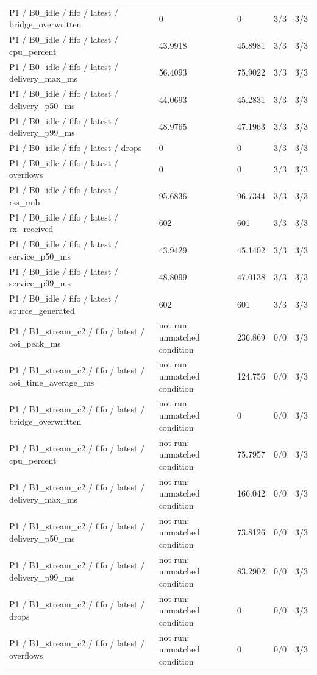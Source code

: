 \begin{tabular}{@{}lllll@{}}
P1 / B0\_idle / fifo / latest / bridge\_overwritten & 0 & 0 & 3/3 & 3/3 \\
P1 / B0\_idle / fifo / latest / cpu\_percent & 43.9918 & 45.8981 & 3/3 & 3/3 \\
P1 / B0\_idle / fifo / latest / delivery\_max\_ms & 56.4093 & 75.9022 & 3/3 & 3/3 \\
P1 / B0\_idle / fifo / latest / delivery\_p50\_ms & 44.0693 & 45.2831 & 3/3 & 3/3 \\
P1 / B0\_idle / fifo / latest / delivery\_p99\_ms & 48.9765 & 47.1963 & 3/3 & 3/3 \\
P1 / B0\_idle / fifo / latest / drops & 0 & 0 & 3/3 & 3/3 \\
P1 / B0\_idle / fifo / latest / overflows & 0 & 0 & 3/3 & 3/3 \\
P1 / B0\_idle / fifo / latest / rss\_mib & 95.6836 & 96.7344 & 3/3 & 3/3 \\
P1 / B0\_idle / fifo / latest / rx\_received & 602 & 601 & 3/3 & 3/3 \\
P1 / B0\_idle / fifo / latest / service\_p50\_ms & 43.9429 & 45.1402 & 3/3 & 3/3 \\
P1 / B0\_idle / fifo / latest / service\_p99\_ms & 48.8099 & 47.0138 & 3/3 & 3/3 \\
P1 / B0\_idle / fifo / latest / source\_generated & 602 & 601 & 3/3 & 3/3 \\
P1 / B1\_stream\_c2 / fifo / latest / aoi\_peak\_ms & not run: unmatched condition & 236.869 & 0/0 & 3/3 \\
P1 / B1\_stream\_c2 / fifo / latest / aoi\_time\_average\_ms & not run: unmatched condition & 124.756 & 0/0 & 3/3 \\
P1 / B1\_stream\_c2 / fifo / latest / bridge\_overwritten & not run: unmatched condition & 0 & 0/0 & 3/3 \\
P1 / B1\_stream\_c2 / fifo / latest / cpu\_percent & not run: unmatched condition & 75.7957 & 0/0 & 3/3 \\
P1 / B1\_stream\_c2 / fifo / latest / delivery\_max\_ms & not run: unmatched condition & 166.042 & 0/0 & 3/3 \\
P1 / B1\_stream\_c2 / fifo / latest / delivery\_p50\_ms & not run: unmatched condition & 73.8126 & 0/0 & 3/3 \\
P1 / B1\_stream\_c2 / fifo / latest / delivery\_p99\_ms & not run: unmatched condition & 83.2902 & 0/0 & 3/3 \\
P1 / B1\_stream\_c2 / fifo / latest / drops & not run: unmatched condition & 0 & 0/0 & 3/3 \\
P1 / B1\_stream\_c2 / fifo / latest / overflows & not run: unmatched condition & 0 & 0/0 & 3/3 \\

\end{tabular}
